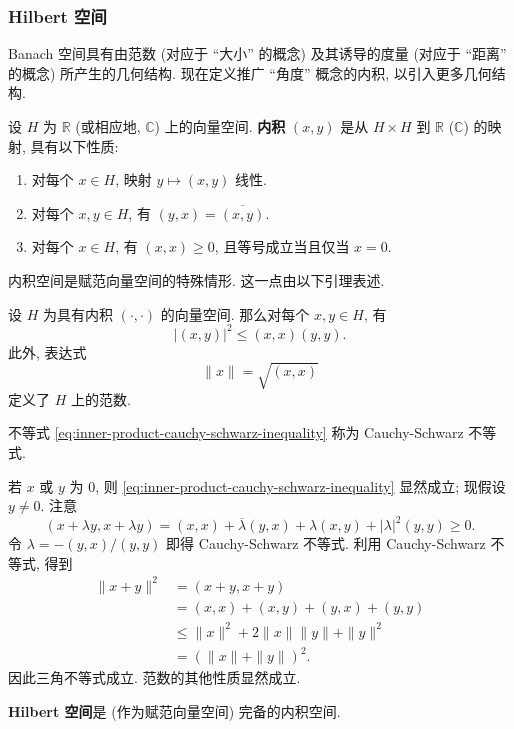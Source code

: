 \subsubsection{Hilbert 空间}\label{subsec:hilbert-spaces}

Banach 空间具有由范数 (对应于 ``大小'' 的概念) 及其诱导的度量 (对应于 ``距离'' 的概念) 所产生的几何结构. 现在定义推广 ``角度'' 概念的内积, 以引入更多几何结构.

\begin{Definition}
\label{def:inner-product}
设 $H$ 为 $\mathbb{R}$ (或相应地, $\mathbb{C}$) 上的向量空间. \textbf{内积} $(x,y)$ 是从 $H\times H$ 到 $\mathbb{R}$ ($\mathbb{C}$) 的映射, 具有以下性质:\begin{enumerate}
\item 对每个 $x\in H$, 映射 $y\mapsto(x,y)$ 线性.
\item 对每个 $x,y\in H$, 有 $(y,x)=\overline{(x,y)}$.
\item 对每个 $x\in H$, 有 $(x,x)\geq0$, 且等号成立当且仅当 $x=0$.
\end{enumerate}
\end{Definition}

内积空间是赋范向量空间的特殊情形. 这一点由以下引理表述.

\begin{Lemma}
\label{lem:inner-product-induced-norm}
设 $H$ 为具有内积 $(\cdot,\cdot)$ 的向量空间. 那么对每个 $x,y\in H$, 有
\begin{equation}\label{eq:inner-product-cauchy-schwarz-inequality}
|(x,y)|^2\leq(x,x)(y,y).
\end{equation}
此外, 表达式
\begin{equation}\label{eq:inner-product-induced-norm}
\|x\|=\sqrt{(x,x)}
\end{equation}
定义了 $H$ 上的范数.
\end{Lemma}

不等式 \eqref{eq:inner-product-cauchy-schwarz-inequality} 称为 Cauchy-Schwarz 不等式.

\begin{Proof}
若 $x$ 或 $y$ 为 0, 则 \eqref{eq:inner-product-cauchy-schwarz-inequality} 显然成立; 现假设 $y\ne0$. 注意
\begin{equation}\label{eq:cauchy-schwarz-positive-quadratic-form}
(x+\lambda y,x+\lambda y)=(x,x)+\overline\lambda(y,x)+\lambda(x,y)+|\lambda|^2(y,y)\geq0.
\end{equation}
令 $\lambda=-(y,x)/(y,y)$ 即得 Cauchy-Schwarz 不等式. 利用 Cauchy-Schwarz 不等式, 得到
\begin{equation}\label{eq:inner-product-norm-triangle-calculation}
\begin{aligned}
\|x+y\|^2&=(x+y,x+y)\\
&=(x,x)+(x,y)+(y,x)+(y,y)\\
&\leq\|x\|^2+2\|x\|\|y\|+\|y\|^2\\
&=(\|x\|+\|y\|)^2.
\end{aligned}
\end{equation}
因此三角不等式成立. 范数的其他性质显然成立.
\end{Proof}

\begin{Definition}
\label{def:hilbert-space}
\textbf{Hilbert 空间}是 (作为赋范向量空间) 完备的内积空间.
\end{Definition}

